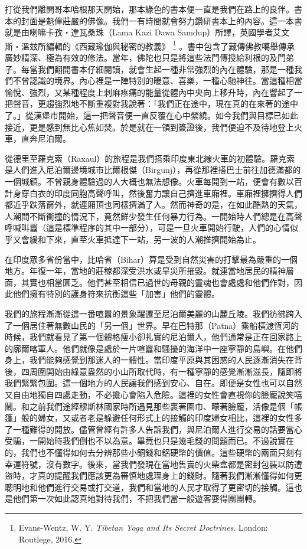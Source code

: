 打從我們離開哥本哈根那天開始，那本綠色的書本便一直是我們在路上的良伴。書本的封面是魁偉莊嚴的佛像。我們一有時間就會努力鑽研書本上的內容。這一本書就是由喇嘛卡孜‧達瓦桑珠（Lama
Kazi Dawa
Samdup）所譯，英國學者艾文斯‧溫玆所編輯的《西藏瑜伽與秘密的教義》%
\footnote{Evans-Wentz, W. Y. \textit{Tibetan Yoga and Its Secret Doctrines}. London: Routlege, 2016.}
。書中包含了藏傳佛教噶舉傳承廣妙精深、極為有效的修法。當年，佛陀也只是將這些法門傳授給利根的及門弟子。每當我們翻開書本仔細閱讀，就會生起一種非常強烈的內在體驗，那是一種我們不曾認識的境界。內心裡是一陣特別的暖意、喜樂，一種心馳神往。當這種相當愉悅、強烈，又某種程度上刺麻疼痛的能量從體內中央向上移升時，內在響起了一把聲音，更趨強烈地不斷重複對我說著：「我們正在途中，現在真的在來著的途中了。」從漢堡市開始，這一把聲音便一直反覆在心中縈繞。如今我們與目標已如此接近，更是感到無比心焦如焚。於是就在一領到簽證後，我們便迫不及待地登上火車，直奔尼泊爾。


從德里至羅克索（Raxaul）的旅程是我們搭乘印度東北線火車的初體驗。羅克索是人們進入尼泊爾邊境城市比爾根傑（Birgunj），再從那裡搭巴士前往加德滿都的一個城鎮。不曾親身體驗過的人大概也無法想像。火車每開到一站，便會有數以百計身穿白衣的印度同胞高聲呼叫，然後奮力讓自己擠進車廂裡。車廂裡擁擠得人們都近乎跌落窗外，就連厢頂也同樣擠滿了人。然而神奇的是，在如此酷熱的天氣，人潮間不斷衝撞的情況下，竟然鮮少發生任何暴力行為。一開始時人們總是在高聲呼喊叫囂（這是標準程序的其中一部分），可是一旦火車開始行駛，人們的心情似乎又會緩和下來，直至火車抵達下一站，另一波的人潮推擠開始為止。

在印度眾多省份當中，比哈省（Bihar）算是受到自然災害的打擊最為嚴重的一個地方。年復一年，當地的莊稼都深受洪水或旱災所摧毀。就連當地居民的精神層面，其實也相當匱乏。他們甚至相信已過世的母親的靈魂也會處處和他們作對，因此他們擁有特別的護身符來抗衡這些「加害」他們的靈體。

我們的旅程漸漸從這一番喧囂的景象躍遷至尼泊爾美麗的山麓丘陵。我們彷彿跨入了一個居住著無數山民的「另一個」世界。早在巴特那（Patna）乘船橫渡恆河的時候，我們就看見了第一個體格瘦小卻扎實的尼泊爾人，他們通常是正在回家路上的廓爾喀軍人。他們就像是處於一片喧囂和騷擾的海洋中一座寧靜的島嶼。在他們身上，我們能夠感覺到那迷人的一體性。當印度平原與其困惑的人民逐漸消失在背後，四周圍開始由綠意盎然的小山所取代時，有一種寧靜的感覺漸漸滋長，隨即將我們緊緊包圍。這一個地方的人民讓我們感到安心、自在。即便是女性也可以自然又自由地獨自四處走動，不必擔心會陷入危險。這裡的女性會直視你的臉龐說笑嘻鬧。和之前我們途經穆斯林國家時所遇見那些裹著圍巾、矇著臉龐，活像是個「帳篷」般的婦女，又或者老是躲避任何形式上的接觸的印度婦女相比，這裡的女性多了一種難得的開放。儘管曾經有許多人告訴我們，與尼泊爾人進行交易的話要當心受騙，一開始時我們倒也不以為意。畢竟也只是幾毛錢的問題而已。不過說實在的，我們也不懂得如何去分辨那些小銅錢和鋁硬幣的價值。這些硬幣的兩面只刻有幸運符號，沒有數字。後來，當我們發現在當地售賣的火柴盒都是密封包裝以防遭盜時，才真的提醒我們應該更為審慎地處理身上的錢財。隨著我們漸漸懂得如何更聰明地和他們進行交易或打交道，我們和當地的人民才取得了更密切的接觸。這也是他們第一次如此認真地對待我們，不把我們當一般遊客耍得團團轉。

